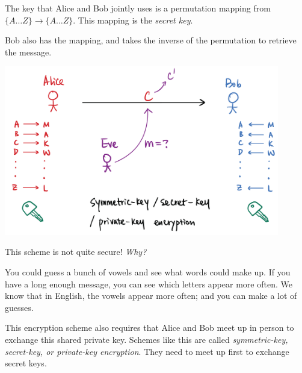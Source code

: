 \begin{example}
    The key that Alice and Bob jointly uses is a permutation mapping from $\{A\dots Z\}\to \{A\dots Z\}$. This mapping is the \emph{secret key}.

    Bob also has the mapping, and takes the inverse of the permutation to retrieve the message.

    \begin{center}
        \includegraphics[width=0.9\textwidth]{images/2023-01-26/substitution_cipher.png}
    \end{center}

    This scheme is not quite secure! \emph{Why?}

    You could guess a bunch of vowels and see what words could make up. If you have a long enough message, you can see which letters appear more often. We know that in English, the vowels appear more often; and you can make a lot of guesses.
\end{example}
\begin{remark*}
    This encryption scheme also requires that Alice and Bob meet up in person to exchange this shared private key. Schemes like this are called \emph{symmetric-key, secret-key, or private-key encryption}. They need to meet up first to exchange secret keys.
\end{remark*}


